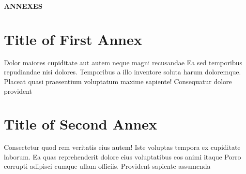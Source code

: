 \documentclass[
    14pt,
    letterpaper,
]{extreport}
\begin{document}
\clearpage

\thispagestyle{empty} %
\vspace*{\fill}
\begin{center}
    {\bfseries ANNEXES}
\end{center}
\vspace*{\fill}

\clearpage

\chapter{Title of First Annex}\label{ann:a}

Dolor maiores cupiditate aut autem neque magni recusandae Ea sed temporibus repudiandae nisi dolores. Temporibus a illo inventore soluta harum doloremque. Placeat quasi praesentium voluptatum maxime sapiente! Consequatur dolore provident

% 

\chapter{Title of Second Annex}\label{ann:b}

Consectetur quod rem veritatis eius autem! Iste voluptas tempora ex cupiditate laborum. Ea quas reprehenderit dolore eius voluptatibus eos animi itaque Porro corrupti adipisci cumque ullam officiis. Provident sapiente assumenda
\end{document}
